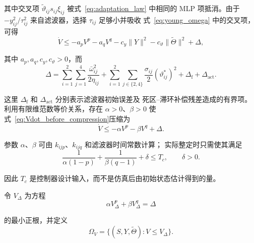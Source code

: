 \documentclass{article}
\begin{document}
其中交叉项 $\widetilde\vartheta_{ij}s_{ij}\xi_{ij}$ 被式~\eqref{eq:adaptation_law}
中相同的 MLP 项抵消。由于
$-y_{ij}^{2}/\tau_{ij}^{2}$ 来自滤波器，选择 $\tau_{ij}$ 足够小并吸收
式~\eqref{eq:young_omega} 中的交叉项，可得
\begin{equation}
 \dot V\leq -a_p V^{p}-a_q V^{q}-c_y\|Y\|^{2}
 -c_\vartheta\|\widetilde\Theta\|^{2}+\Delta,

 \tag{68}
\label{eq:Vdot_before_compression}
\end{equation}

其中 $a_p,a_q,c_y,c_\vartheta>0$，而
\begin{equation}
 \Delta=\sum_{i=1}^{2}\sum_{j=1}^{4}
 \frac{\bar\omega_{ij}^{2}}{2\eta_{ij}}
 +\sum_{i=1}^{2}\sum_{j\in\{2,4\}}
 \frac{\sigma_{ij}}{2}(\vartheta_{ij}^{*})^{2}
 +\Delta_{\mathrm{f}}+\Delta_{\mathrm{act}} .

 \tag{69}
\label{eq:Delta_definition}
\end{equation}

这里 $\Delta_{\mathrm f}$ 和 $\Delta_{\mathrm{act}}$ 分别表示滤波器初始误差及
死区--滞环补偿残差造成的有界项。利用有限维范数等价关系，存在
$\alpha>0$、$\beta>0$ 使式~\eqref{eq:Vdot_before_compression}压缩为
\begin{equation}
 \dot V\leq-\alpha V^{p}-\beta V^{q}+\Delta .

 \tag{70}
\label{eq:Vdot_final}
\end{equation}

参数 $\alpha$、$\beta$ 可由 $k_{ijp}$、$k_{ijq}$ 和滤波器时间常数计算；
实际整定时只需使其满足
\begin{equation}
 \frac{1}{\alpha(1-p)}+\frac{1}{\beta(q-1)}+\delta\leq T_c,
 \qquad \delta>0 .

 \tag{71}
\label{eq:Tc_design_condition}
\end{equation}

因此 $T_c$ 是控制器设计输入，而不是仿真后由初始状态估计得到的量。

令 $V_\Delta$ 为方程
\begin{equation}
 \alpha V_\Delta^{p}+\beta V_\Delta^{q}=\Delta

 \tag{72}
\label{eq:Vdelta_equation}
\end{equation}

的最小正根，并定义
\begin{equation}
 \Omega_V=\{(S,Y,\widetilde\Theta):V\leq V_\Delta\} .

 \tag{73}
\label{eq:OmegaV}
\end{equation}
\end{document}
